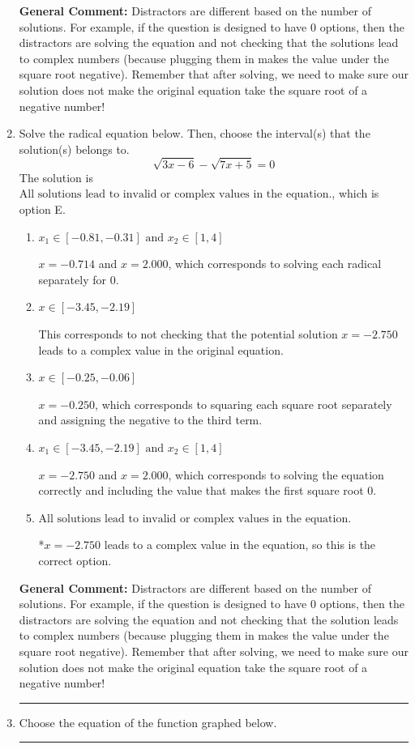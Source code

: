 \documentclass{extbook}[14pt]
\newcommand{\litem}[1]{\item #1

\rule{\textwidth}{0.4pt}}
\begin{document}
\begin{enumerate}
{\textbf{General Comment:} Distractors are different based on the number of solutions. For example, if the question is designed to have 0 options, then the distractors are solving the equation and not checking that the solutions lead to complex numbers (because plugging them in makes the value under the square root negative). Remember that after solving, we need to make sure our solution does not make the original equation take the square root of a negative number!
}
\litem{
Solve the radical equation below. Then, choose the interval(s) that the solution(s) belongs to.
\[ \sqrt{3 x - 6} - \sqrt{7 x + 5} = 0 \]The solution is \( \text{All solutions lead to invalid or complex values in the equation.} \), which is option E.\begin{enumerate}[label=\Alph*.]
\item \( x_1 \in [-0.81, -0.31] \text{ and } x_2 \in [1,4] \)

$x = -0.714$ and $x = 2.000$, which corresponds to solving each radical separately for 0.
\item \( x \in [-3.45,-2.19] \)

This corresponds to not checking that the potential solution $x = -2.750$ leads to a complex value in the original equation.
\item \( x \in [-0.25,-0.06] \)

$x = -0.250$, which corresponds to squaring each square root separately and assigning the negative to the third term.
\item \( x_1 \in [-3.45, -2.19] \text{ and } x_2 \in [1,4] \)

$x = -2.750$ and $x = 2.000$, which corresponds to solving the equation correctly and including the value that makes the first square root 0.
\item \( \text{All solutions lead to invalid or complex values in the equation.} \)

*$x = -2.750$ leads to a complex value in the equation, so this is the correct option.
\end{enumerate}

\textbf{General Comment:} Distractors are different based on the number of solutions. For example, if the question is designed to have 0 options, then the distractors are solving the equation and not checking that the solution leads to complex numbers (because plugging them in makes the value under the square root negative). Remember that after solving, we need to make sure our solution does not make the original equation take the square root of a negative number!
}
\litem{
Choose the equation of the function graphed below.

}
\end{enumerate}
\end{document}
